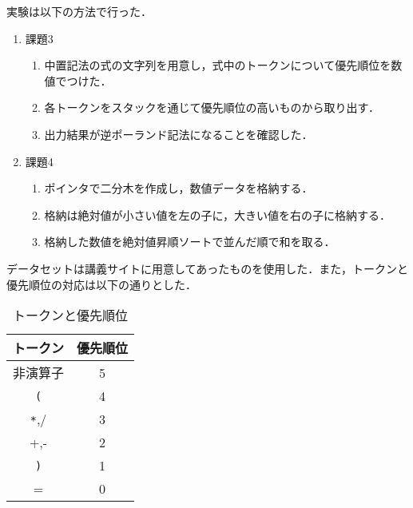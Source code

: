 実験は以下の方法で行った．
\begin{enumerate}
\item 課題3
  \begin{enumerate}
  \item 中置記法の式の文字列を用意し，式中のトークンについて優先順位を数値でつけた．
  \item 各トークンをスタックを通じて優先順位の高いものから取り出す．
  \item 出力結果が逆ポーランド記法になることを確認した．
  \end{enumerate}
\item 課題4
  \begin{enumerate}
  \item ポインタで二分木を作成し，数値データを格納する．
  \item 格納は絶対値が小さい値を左の子に，大きい値を右の子に格納する．
  \item 格納した数値を絶対値昇順ソートで並んだ順で和を取る．
  \end{enumerate}
\end{enumerate}
データセットは講義サイトに用意してあったものを使用した．また，トークンと優先順位の対応は以下の通りとした．

\begin{table}[htb]
  \begin{center}
    \caption{トークンと優先順位}
    \begin{tabular}{|c||c|} \hline
      トークン & 優先順位 \\\hline
      非演算子 & 5        \\
      \verb|(|& 4        \\
      \verb|*|,/     & 3 \\
      +,-     & 2        \\
      \verb|)|& 1        \\
      =       & 0        \\\hline 
    \end{tabular}
  \end{center}
\end{table}



